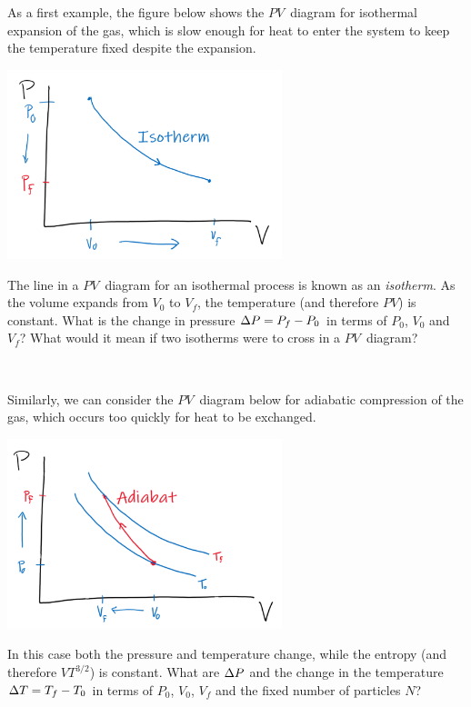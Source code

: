 As a first example, the figure below shows the $PV$~diagram for isothermal expansion of the gas, which is slow enough for heat to enter the system to keep the temperature fixed despite the expansion.
\begin{center}
  \includegraphics[width=0.6\textwidth]{figs/unit05_isotherm.pdf}
\end{center}
The line in a $PV$~diagram for an isothermal process is known as an \textit{isotherm}.
As the volume expands from $V_0$ to $V_f$, the temperature (and therefore $PV$) is constant.
What is the change in pressure $\Delta P = P_f - P_0$ in terms of $P_0$, $V_0$ and $V_f$?
What would it mean if two isotherms were to cross in a $PV$~diagram?
\begin{mdframed}
  \ \\[100 pt]
\end{mdframed}

Similarly, we can consider the $PV$~diagram below for adiabatic compression of the gas, which occurs too quickly for heat to be exchanged.
\begin{center}
  \includegraphics[width=0.6\textwidth]{figs/unit05_adiabat.pdf}
\end{center}
In this case both the pressure and temperature change, while the entropy (and therefore $VT^{3 / 2}$) is constant.
What are $\Delta P$ and the change in the temperature $\Delta T = T_f - T_0$ in terms of $P_0$, $V_0$, $V_f$ and the fixed number of particles $N$? %
\begin{mdframed}
  \ \\[120 pt]
\end{mdframed}



